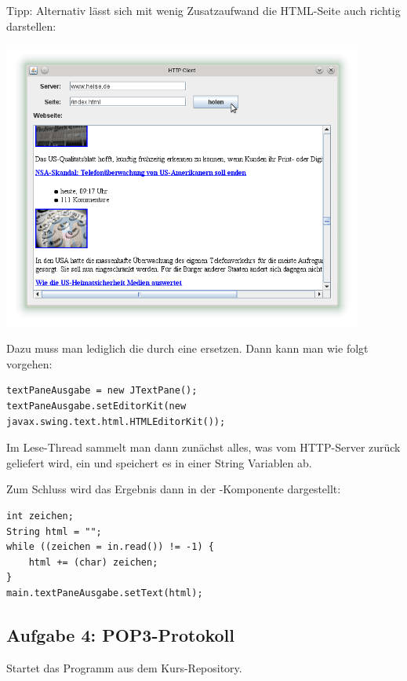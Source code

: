 Tipp: Alternativ lässt sich mit wenig Zusatzaufwand die HTML-Seite auch richtig
darstellen:

\begin{center}
\includegraphics[width=0.89\textwidth]{./inf/SEKII/43_Java_ClientServer/HttpClient_HTMLEditorKit.png}
\end{center}

Dazu muss man lediglich die  durch eine 
ersetzen. Dann kann man wie folgt vorgehen:

\begin{lstlisting}
textPaneAusgabe = new JTextPane();
textPaneAusgabe.setEditorKit(new javax.swing.text.html.HTMLEditorKit());
\end{lstlisting}

Im Lese-Thread sammelt man dann zunächst alles, was vom HTTP-Server zurück
geliefert wird, ein und speichert es in einer String Variablen ab.

Zum Schluss wird das Ergebnis dann in der -Komponente
dargestellt:

\begin{lstlisting}
int zeichen;
String html = "";
while ((zeichen = in.read()) != -1) {
    html += (char) zeichen;
}
main.textPaneAusgabe.setText(html);
\end{lstlisting}


\subsection{Aufgabe 4: POP3-Protokoll}

Startet das Programm  aus dem Kurs-Repository.

